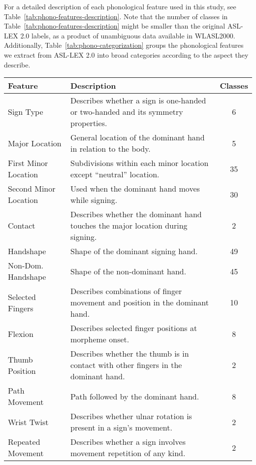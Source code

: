 For a detailed description of each phonological feature used in this study, see Table~\ref{tab:phono-features-description}. Note that the number of classes in Table~\ref{tab:phono-features-description} might be smaller than the original ASL-LEX 2.0 labels, as a product of unambiguous data available in WLASL2000. Additionally, Table~\ref{tab:phono-categorization} groups the phonological features we extract from ASL-LEX 2.0 into broad categories according to the aspect they describe.

\begin{table*}[]
\centering
\begin{tabular}{llc}
\hline
\textbf{Feature} & \textbf{Description} & \textbf{Classes} \\
\hline
Sign Type & Describes whether a sign is one-handed or two-handed and its symmetry properties. & 6 \\
Major Location & General location of the dominant hand in relation to the body. & 5 \\
First Minor Location & Subdivisions within each minor location except ``neutral'' location. & 35 \\
Second Minor Location & Used when the dominant hand moves while signing. & 30 \\
Contact & Describes whether the dominant hand touches the major location during signing. & 2 \\
Handshape & Shape of the dominant signing hand. & 49 \\
Non-Dom. Handshape & Shape of the non-dominant hand. & 45 \\
Selected Fingers & Describes combinations of finger movement and position in the dominant hand. & 10 \\
Flexion & Describes selected finger positions at morpheme onset. & 8 \\
Thumb Position & Describes whether the thumb is in contact with other fingers in the dominant hand. & 2 \\
Path Movement & Path followed by the dominant hand. & 8 \\
Wrist Twist & Describes whether ulnar rotation is present in a sign's movement. & 2 \\
Repeated Movement & Describes whether a sign involves movement repetition of any kind. & 2 \\
\hline
\end{tabular}
\caption{Description of all phonological features used in this study.}
\label{tab:phono-features-description}
\end{table*}

